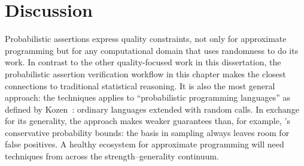 \section{Discussion}

Probabilistic assertions express quality constraints, not only for
approximate programming but for any computational domain that uses randomness
to do its work.
In contrast to the other quality-focused work in this dissertation,
the probabilistic assertion verification workflow in this chapter makes the
closest connections to traditional statistical reasoning.
It is also the most general approach:
the techniques
applies to ``probabilistic programming languages'' as defined
by Kozen~\cite{kozen}: ordinary languages extended with random calls.
In exchange for its generality, the approach makes weaker guarantees than, for
example, 's conservative probability bounds:
the basis in sampling always leaves room for false positives.
A healthy ecosystem for approximate programming will need techniques from
across the strength--generality continuum.
